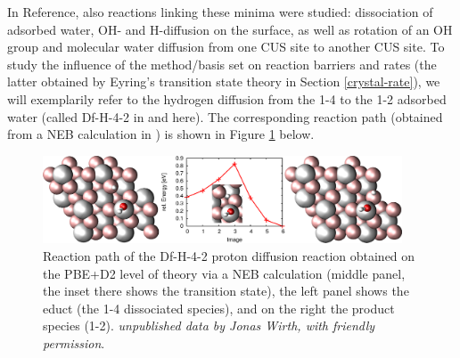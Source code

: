 \documentclass[11pt,DIV=13,BCOR=5mm,a4paper,headinclude]{scrbook}
\begin{document}
In Reference\cite{WirthJPCC2012}, also reactions linking these minima were studied: dissociation of adsorbed water, OH- and H-diffusion on the surface, as well as rotation of an OH group and molecular water diffusion from one CUS site to another CUS site.
To study the influence of the method/basis set on reaction barriers and rates (the latter obtained by Eyring's transition state theory in Section \ref{crystal-rate}), we will exemplarily refer to the hydrogen diffusion from the 1-4 to the 1-2 adsorbed water (called Df-H-4-2 in \cite{WirthJPCC2012} and here).
The corresponding reaction path (obtained from a NEB calculation in \cite{WirthJPCC2012}) is shown in Figure \ref{abb:df-h-4-2} below.
\begin{figure}[h]
\centering
\includegraphics[width=0.95\textwidth]{figures/0001/NEB-path/df-h-4-2.pdf}
\caption{Reaction path of the Df-H-4-2 proton diffusion reaction obtained on the PBE+D2 level of theory via a NEB calculation (middle panel, the inset there shows the transition state), the left panel shows the educt  (the 1-4 dissociated species), and on the right the product species (1-2).
\textit{unpublished data by Jonas Wirth, with friendly permission}.}
       \label{abb:df-h-4-2}
\end{figure}
\end{document}
